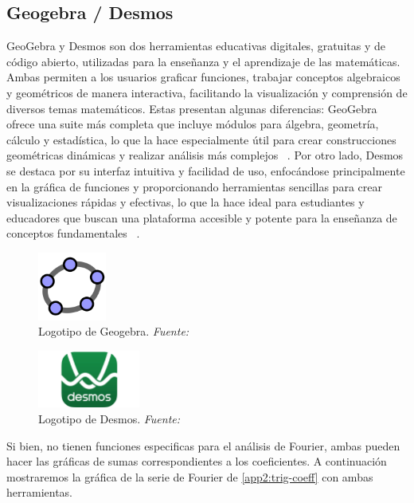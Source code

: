 \subsection{Geogebra / Desmos}
GeoGebra y Desmos son dos herramientas educativas digitales, gratuitas y de código abierto, utilizadas para la enseñanza y el aprendizaje de las matemáticas. Ambas permiten a los usuarios graficar funciones, trabajar conceptos algebraicos y geométricos de manera interactiva, facilitando la visualización y comprensión de diversos temas matemáticos. Estas presentan algunas diferencias: GeoGebra ofrece una suite más completa que incluye módulos para álgebra, geometría, cálculo y estadística, lo que la hace especialmente útil para crear construcciones geométricas dinámicas y realizar análisis más complejos ~\cite{GeoGebra2024}. Por otro lado, Desmos se destaca por su interfaz intuitiva y facilidad de uso, enfocándose principalmente en la gráfica de funciones y proporcionando herramientas sencillas para crear visualizaciones rápidas y efectivas, lo que la hace ideal para estudiantes y educadores que buscan una plataforma accesible y potente para la enseñanza de conceptos fundamentales ~\cite{Desmos2024}.

\begin{figure}[H]
	\centering
	\includegraphics[width=0.2\textwidth]{img/chapter02/logo_geogebra.png}
	\caption[Logotipo de Geogebra.]{Logotipo de Geogebra. \textit{Fuente: ~\cite{GeoGebra2024}}}
	\label{fig:logo-geogebra}
\end{figure}


\begin{figure}[H]
	\centering
	\includegraphics[width=0.3\textwidth]{img/chapter02/logo_desmos.jpg} 
	\caption[Logotipo de Desmos.]{Logotipo de Desmos. \textit{Fuente: ~\cite{Desmos2024}}}
	\label{fig:logo-desmos}
\end{figure}

Si bien, no tienen funciones especificas para el análisis de Fourier, ambas pueden hacer las gráficas de sumas correspondientes a los coeficientes. A continuación mostraremos la gráfica de la serie de Fourier de \ref{app2:trig-coeff} con ambas herramientas.


